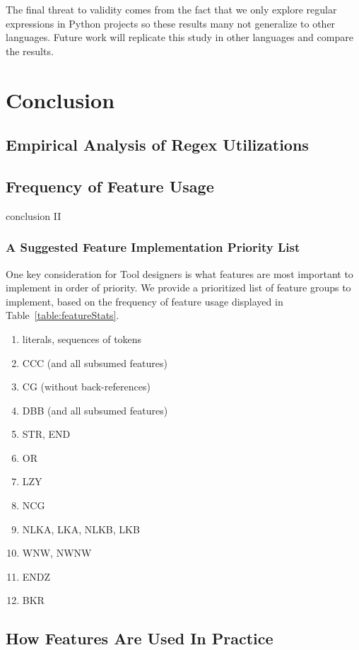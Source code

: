 \documentclass[conference]{IEEEtran}
\begin{document}
The final threat to validity comes from the fact that we only explore regular expressions in Python projects so these results many not generalize to other languages. Future work will replicate this study in other languages and compare the results.

\section{Conclusion}
\label{sec:conclusion}

\subsection{Empirical Analysis of Regex Utilizations}


\subsection{Frequency of Feature Usage}

conclusion II

\subsubsection{A Suggested Feature Implementation Priority List}

One key consideration for Tool designers is what features are most important to implement in order of priority.  We provide a prioritized list of feature groups to implement, based on the frequency of feature usage displayed in Table~\ref{table:featureStats}.

\begin{enumerate}[1]
\item literals, sequences of tokens
\item CCC (and all subsumed features)
\item CG (without back-references)
\item DBB (and all subsumed features)
\item STR, END
\item OR
\item LZY
\item NCG
\item NLKA, LKA, NLKB, LKB
\item WNW, NWNW
\item ENDZ
\item BKR
\end{enumerate}

\subsection{How Features Are Used In Practice}
\end{document}
